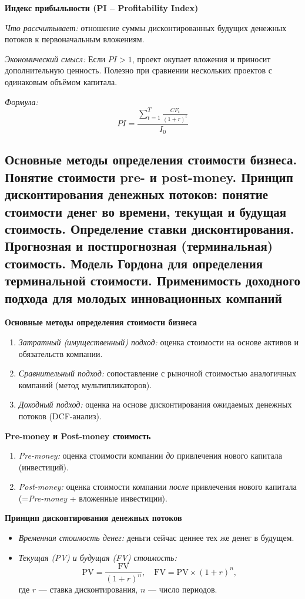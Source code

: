 \textbf{Индекс прибыльности (PI – Profitability Index)}

\textit{Что рассчитывает:} отношение суммы дисконтированных будущих денежных потоков к первоначальным вложениям.

\textit{Экономический смысл:} Если $PI > 1$, проект окупает вложения и приносит дополнительную ценность. Полезно при сравнении нескольких проектов с одинаковым объёмом капитала.

\textit{Формула:}
\begin{equation}
    PI = \frac{\sum \limits_{t=1} ^T \frac{CF_t}{(1+r)^t}}{I_0}
\end{equation}
\pagebreak


\subsection{Основные методы определения стоимости бизнеса. Понятие стоимости pre- и post-money. Принцип дисконтирования денежных потоков: понятие стоимости денег во времени, текущая и будущая стоимость. Определение ставки дисконтирования. Прогнозная и постпрогнозная (терминальная) стоимость. Модель Гордона для определения терминальной стоимости. Применимость доходного подхода для молодых инновационных компаний}

\textbf{Основные методы определения стоимости бизнеса}
\begin{enumerate}
    \item \textit{Затратный (имущественный) подход:} оценка стоимости на основе активов и обязательств компании.
    \item \textit{Сравнительный подход:} сопоставление с рыночной стоимостью аналогичных компаний (метод мультипликаторов).
    \item \textit{Доходный подход:} оценка на основе дисконтирования ожидаемых денежных потоков (DCF-анализ).
\end{enumerate}

\textbf{Pre-money и Post-money стоимость}
\begin{enumerate}
    \item \textit{Pre-money:} оценка стоимости компании \textit{до} привлечения нового капитала (инвестиций).
    \item \textit{Post-money:} оценка стоимости компании \textit{после} привлечения нового капитала (=\textit{Pre-money} + вложенные инвестиции).
\end{enumerate}

\textbf{Принцип дисконтирования денежных потоков}
\begin{itemize}
    \item \textit{Временная стоимость денег:} деньги сейчас ценнее тех же денег в будущем.
    \item \textit{Текущая (PV) и будущая (FV) стоимость:}
    \[
      \text{PV} = \frac{\text{FV}}{(1 + r)^n},
      \quad
      \text{FV} = \text{PV} \times (1 + r)^n,
    \]
    где $r$ --- ставка дисконтирования, $n$ --- число периодов.
\end{itemize}

